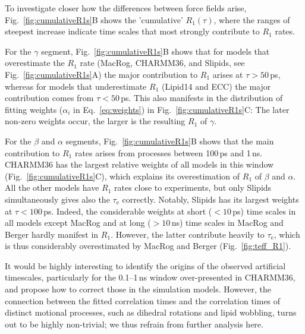 \documentclass[journal=jcisd8,manuscript=article,layout=twocolumn]{achemso}
\begin{document}
To investigate closer how the differences between force fields arise, Fig.~\ref{fig:cumulativeR1s}B shows the 
'cumulative' $R_1(\tau)$, where the ranges of steepest increase indicate time scales that most strongly contribute to $R_1$ rates.

For the $\gamma$ segment,
Fig.~\ref{fig:cumulativeR1s}B shows
that for models that overestimate the $R_1$ rate 
(MacRog, CHARMM36, and Slipids, see Fig.~\ref{fig:cumulativeR1s}A)
the major contribution to $R_1$ arises at $\tau>50$\,ps, whereas for models that underestimate $R_1$ 
(Lipid14 and ECC)
the major contribution comes from $\tau<50$\,ps. 
%
This also manifests in the
distribution of fitting weights ($\alpha_i$ in Eq.~\eqref{eq:weights}) in Fig.~\ref{fig:cumulativeR1s}C:
The later non-zero weights occur, the larger is the resulting $R_1$ of $\gamma$.

For the $\beta$ and $\alpha$ segments, Fig.~\ref{fig:cumulativeR1s}B shows
that the main contribution to $R_1$ rates arises from processes
between 100\,ps and 1\,ns.
%
CHARMM36 has the largest relative weights of all models in this window (Fig.~\ref{fig:cumulativeR1s}C),
which explains its overestimation of $R_1$ of $\beta$ and $\alpha$.
%
All the other models have $R_1$ rates close to experiments,
but only Slipids simultaneously gives also the $\tau_\mathrm e$ correctly.
Notably, Slipids has its largest weights at $\tau<100$\,ps.
%
Indeed, the considerable weights
at short ($<10$\,ps) time scales  in all models except MacRog and
at long ($>10$\,ns) time scales in %
MacRog and Berger hardly manifest in $R_1$.
%
However, the latter contribute heavily to $\tau_\mathrm e$,
which is thus considerably overestimated by MacRog and Berger (Fig.~\ref{fig:teff_R1}).

It would be highly interesting to identify the origins of the observed artificial timescales,
particularly for the 0.1--1\,ns window over-presented in CHARMM36, and
propose how to correct those in the simulation models.
However, the connection between the fitted correlation times and the correlation times of distinct motional processes, such as dihedral rotations and lipid wobbling, turns out to be highly non-trivial; we thus refrain from further analysis here.
\end{document}
